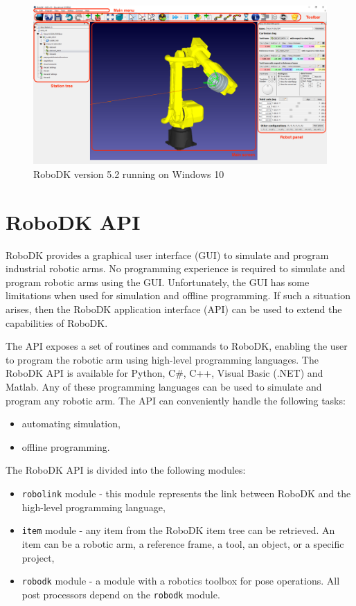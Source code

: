\begin{figure}[h]
    \centering
    \includegraphics[width=0.9\linewidth]{img/robodk_interface_v_2.png}
    \caption{RoboDK version 5.2 running on Windows 10}
    \label{fig:robodkinterface}
\end{figure}

\section{RoboDK API}

RoboDK provides a graphical user interface (GUI) to simulate and program industrial robotic arms. No programming experience is required to simulate and program robotic arms using the GUI. Unfortunately, the GUI has some limitations when used for simulation and offline programming. If such a situation arises, then the RoboDK application interface (API) can be used to extend the capabilities of RoboDK.

The API exposes a set of routines and commands to RoboDK, enabling the user to program the robotic arm using high-level programming languages. The RoboDK API is available for Python, C\#, C++, Visual Basic (.NET) and Matlab. Any of these programming languages can be used to simulate and program any robotic arm. The API can conveniently handle the following tasks:

\begin{itemize}
    \item automating simulation,
    \item offline programming.
\end{itemize}

The RoboDK API is divided into the following modules:


\begin{itemize}
    \item \texttt{robolink} module - this module represents the link between RoboDK and the high-level programming language,
    \item \texttt{item} module - any item from the RoboDK item tree can be retrieved.  An item can be a robotic arm, a reference frame, a tool, an object, or a specific project,
    \item \texttt{robodk} module - a module with a robotics toolbox for pose operations. All post processors depend on the \texttt{robodk} module.
\end{itemize}

